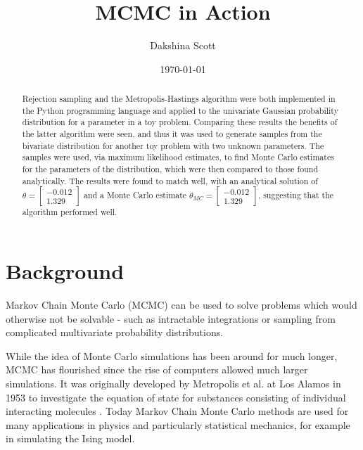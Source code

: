\documentclass[a4paper,11pt,twoside]{article}
\begin{document}
 
\title{MCMC in Action}

\date{\today} 
\author{Dakshina Scott} 
\maketitle

\begin{abstract} 
Rejection sampling and the Metropolis-Hastings algorithm were both
implemented in the Python programming language and applied to the univariate
Gaussian probability distribution for a parameter in a toy problem. Comparing
these results the benefits of the latter algorithm were seen, and thus it was
used to generate samples from the bivariate distribution for another toy
problem with two unknown parameters.
The samples were used, via maximum likelihood estimates, to find
Monte Carlo estimates for the parameters of the distribution, which were then
compared to those found analytically. The results were found to match well, with an
analytical solution of 
$\theta = \begin{bmatrix} 
		-0.012 \\ 
	1.329 \end{bmatrix}$ and a Monte Carlo estimate $\theta_{MC} = \begin{bmatrix} 
		-0.012 \\ 
	1.329 \end{bmatrix}$, suggesting that the algorithm performed well.  

\end{abstract}

\tableofcontents

\section{Background} 
Markov Chain Monte Carlo (MCMC) can be used to solve problems which would
otherwise not be solvable - such as intractable integrations or sampling from
complicated multivariate probability distributions.  

While the idea of Monte Carlo simulations has been
around for much longer, MCMC has flourished since the rise of computers allowed
much larger simulations. It was originally developed by Metropolis et al. at Los Alamos in
1953 to investigate the equation of state for substances consisting of
individual interacting molecules \cite{metropolis}. Today Markov Chain Monte
Carlo methods are used for many applications in physics and particularly statistical
mechanics, for example in simulating the Ising model\cite{statphys}.
\end{document}
